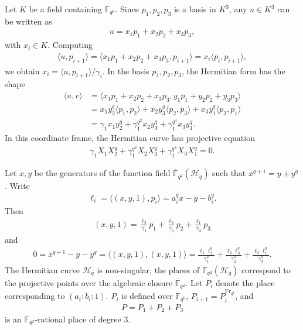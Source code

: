 \documentclass[entropy,article,submit,pdftex,moreauthors]{Definitions/mdpi}
\newcommand{\Frob}{{\mathrm{Fr}_{q^2}}}
\begin{document}
Let $K$ be a field containing $\mathbb{F}_{q^6}$. Since $p_1,p_2,p_3$ is a basis in $K^3$, any $u\in K^3$ can be written as
\begin{align*} %
u=x_1p_1+x_2p_2+x_3p_3,
\end{align*}
with $x_i\in K$. Computing
\begin{align*}
\langle u, p_{i+1} \rangle = \langle x_1p_1+x_2p_2+x_3p_3, p_{i+1} \rangle = x_i \langle p_{i}, p_{i+1} \rangle,
\end{align*}
we obtain $x_i=\langle u,p_{i+1} \rangle / \gamma_i$. In the basis $p_1,p_2,p_3$, the Hermitian form has the shape
\begin{align*}
\langle u,v \rangle &= \langle x_1p_1+x_2p_2+x_3p_3,y_1p_1+y_2p_2+y_3p_3 \rangle \\
&= x_1y_2^q \langle p_1,p_2 \rangle + x_2y_3^q \langle p_2,p_3 \rangle + x_3y_1^q \langle p_3,p_1 \rangle\\
&=\gamma_1 x_1y_2^q+\gamma_1^{q^2} x_2y_3^q+\gamma_1^{q^4} x_3y_1^q.
\end{align*}
In this coordinate frame, the Hermitian curve has projective equation
\begin{align*} %
\gamma_1 X_1X_2^q+\gamma_1^{q^2} X_2X_3^q+\gamma_1^{q^4} X_3X_1^q=0.
\end{align*}

Let $x,y$ be the generators of the function field $\overline{\mathbb{F}}_{q^2}(\mathscr{H}_q)$ such that $x^{q+1}=y+y^q$. Write
\begin{align*} %
\ell_i=\langle (x,y,1), p_i \rangle = a_i^qx-y-b_i^q.
\end{align*}
Then
\begin{align*} %
(x,y,1)=\frac{\ell_{2}}{\gamma_1} p_1+\frac{\ell_{3}}{\gamma_2} p_2+\frac{\ell_{1}}{\gamma_3} p_3
\end{align*}
and
\begin{align} \label{eq:ell-q-lin-dep}
0=x^{q+1}-y-y^q = \langle (x,y,1), (x,y,1) \rangle = \frac{\ell_1\ell_{2}^q}{\gamma_1^q} + \frac{\ell_2\ell_{3}^q}{\gamma_2^q} + \frac{\ell_3\ell_{1}^q}{\gamma_3^q}.
\end{align}
The Hermitian curve $\mathscr{H}_q$ is non-singular, the places of $\overline{\mathbb{F}}_{q^2}(\mathscr{H}_q)$ correspond to the projective points over the algebraic closure $\overline{\mathbb{F}}_{q^2}$. Let $P_i$ denote the place corresponding to $(a_i:b_i:1)$. $P_i$ is defined over $\mathbb{F}_{q^6}$, $P_{i+1}=P_i^\Frob$, and 
\begin{align*} %
P=P_1+P_2+P_3
\end{align*}
is an $\mathbb{F}_{q^2}$-rational place of degree $3$. 
\end{document}
